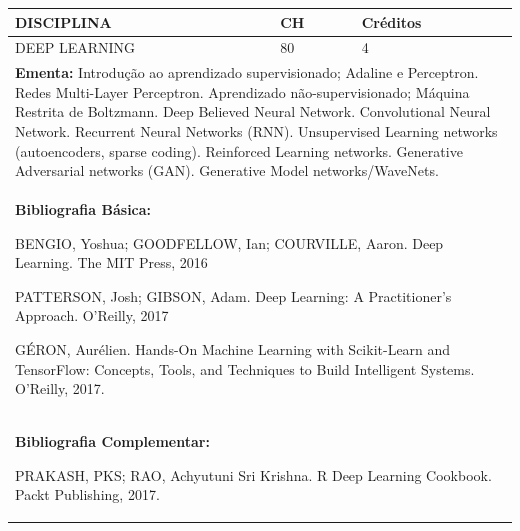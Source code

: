\documentclass[a4paper, 12pt, openright, oneside, german, french, english, brazil]{abntex2}
\begin{document}
\begin{table}[!h]
  \footnotesize
  \centering
  \begin{tabular}{|p{100mm}|p{10mm}|p{20mm}|}
    \hline
    \textbf{DISCIPLINA} & \textbf{CH} & \textbf{Créditos} \\
    \hline
    DEEP LEARNING & 80 & 4 \\
    \hline
    \multicolumn{3}{|p{130mm}|}{\textbf{Ementa:}  Introdução ao aprendizado supervisionado; Adaline e Perceptron. Redes Multi-Layer Perceptron. Aprendizado não-supervisionado; Máquina Restrita de Boltzmann. Deep Believed Neural Network. Convolutional Neural Network. Recurrent Neural Networks (RNN). Unsupervised Learning networks (autoencoders, sparse coding). Reinforced Learning networks. Generative Adversarial networks (GAN). Generative Model networks/WaveNets.} \\
    \hline
    \multicolumn{3}{|p{130mm}|}{\textbf{Bibliografia Básica:}

    BENGIO, Yoshua; GOODFELLOW, Ian; COURVILLE, Aaron. Deep Learning. The MIT Press, 2016

PATTERSON, Josh; GIBSON, Adam. Deep Learning: A Practitioner's Approach. O’Reilly, 2017

GÉRON, Aurélien. Hands-On Machine Learning with Scikit-Learn and TensorFlow: Concepts, Tools, and Techniques to Build Intelligent Systems. O’Reilly, 2017.
} \\
    \hline
    \multicolumn{3}{|p{130mm}|}{\textbf{Bibliografia Complementar:}

    PRAKASH, PKS; RAO, Achyutuni Sri Krishna. R Deep Learning Cookbook. Packt Publishing, 2017.} \\
    \hline
  \end{tabular}
\end{table}
\end{document}

